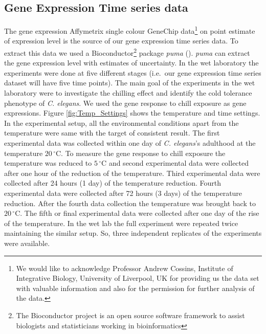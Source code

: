 \subsection{Gene Expression Time series data}
The gene expression Affymetrix single colour GeneChip data\footnote{We would like to acknowledge Professor Andrew Cossins, Institute of Integrative Biology, University of Liverpool, UK for providing us the data set with valuable information and also for the permission for further analysis of the data.} on point estimate of expression level is the source of our gene expression time series data. To extract this data we used a Bioconductor\footnote{The Bioconductor project is an open source software framework to assist biologists and statisticians working in bioinformatics} package \textit{puma} (\cite{puma}). \textit{puma} can extract the gene expression level with estimates of uncertainty. In the wet laboratory the experiments were done at five different stages (i.e.\ our gene expression time series dataset will have five time points). The main goal of the experiments in the wet laboratory were to investigate the chilling effect and identify the cold tolerance phenotype of \textit{C. elegans}. We used the gene response to chill exposure as gene expressions. Figure \ref{fig:Temp_Settings} shows the temperature and time settings. In the experimental setup, all the environmental conditions apart from the temperature were same with the target of consistent result. The first experimental data was collected within one day of \textit{C. elegans}'s adulthood at the temperature $20\,^{\circ}\mathrm{C}$. To measure the gene response to chill exposure the temperature was reduced to $5\,^{\circ}\mathrm{C}$ and second experimental data were collected after one hour of the reduction of the temperature. Third experimental data were collected after 24 hours (1 day) of the temperature reduction.  Fourth experimental data were collected after 72 hours (3 days) of the temperature reduction. After the fourth data collection the temperature was brought back to  $20\,^{\circ}\mathrm{C}$. The fifth or final experimental data were collected after one day of the rise of the temperature. In the wet lab the full experiment were repeated twice maintaining the similar setup. So, three independent replicates of the  experiments were available. 
